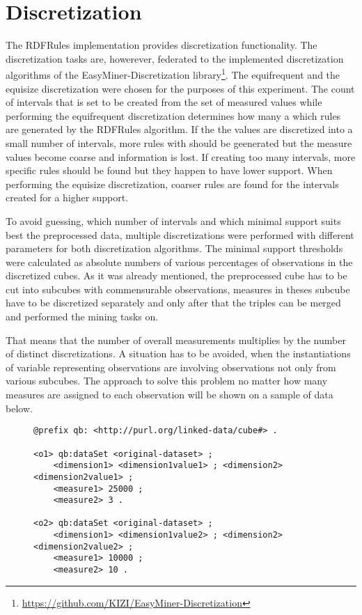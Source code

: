 \section{Discretization\label{discretization}}

The RDFRules implementation provides discretization functionality. The discretization tasks are, howerever, federated to the implemented discretization algorithms of the EasyMiner-Discretization library\footnote{\href{https://github.com/KIZI/EasyMiner-Discretization}{https://github.com/KIZI/EasyMiner-Discretization}}. The equifrequent and the equisize discretization were chosen for the purposes of this experiment. The count of intervals that is set to be created from the set of measured values while performing the equifrequent discretization determines how many a which rules are generated by the RDFRules algorithm. If the the values are discretized into a small number of intervals, more rules with should be geenerated but the measure values become coarse and information is lost. If creating too many intervals, more specific rules should be found but they happen to have lower support. When performing the equisize discretization, coarser rules are found for the intervals created for a higher support. 

To avoid guessing, which number of intervals and which minimal support suits best the preprocessed data, multiple discretizations were performed with different parameters for both discretization algorithms. The minimal support thresholds were calculated as absolute numbers of various percentages of observations in the discretized cubes. As it was already mentioned, the preprocessed cube has to be cut into subcubes with commensurable observations, measures in theses subcube have to be discretized separately and only after that the triples can be merged and performed the mining tasks on.

That means that the number of overall measurements multiplies by the number of distinct discretizations. A situation has to be avoided, when the instantiations of variable representing observations are involving observations not only from various subcubes. The approach to solve this problem no matter how many measures are assigned to each observation will be shown on a sample of data below.

\begin{figure}[h]
\begin{lstlisting}[language = turtle, caption={XYZ}, label={discsample},captionpos=b escapeinside={(*@}{@*)}]
@prefix qb: <http://purl.org/linked-data/cube#> .

<o1> qb:dataSet <original-dataset> ;
    <dimension1> <dimension1value1> ; <dimension2> <dimension2value1> ;
    <measure1> 25000 ;
    <measure2> 3 .

<o2> qb:dataSet <original-dataset> ;
    <dimension1> <dimension1value2> ; <dimension2> <dimension2value2> ;
    <measure1> 10000 ;
    <measure2> 10 .
 \end{lstlisting}
\end{figure}

